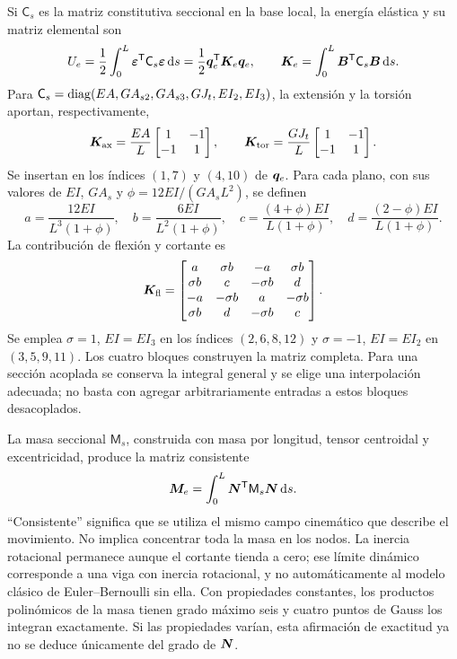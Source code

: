 Si $\mathsf C_s$ es la matriz constitutiva seccional en la base local, la energía
elástica y su matriz elemental son
\begin{equation}
 U_e=\frac12\int_0^L\bm{\varepsilon}^{\mathsf T}\mathsf C_s\bm{\varepsilon}\,\mathrm d s
 =\frac12\bm{q}_e^{\mathsf T}\boldsymbol{K}_e\bm{q}_e,
 \qquad
 \boldsymbol{K}_e=\int_0^L\boldsymbol{B}^{\mathsf T}\mathsf C_s\boldsymbol{B}\,\mathrm d s.
\end{equation}
Para $\mathsf C_s=\operatorname{diag}(EA,GA_{s2},GA_{s3},GJ_t,EI_2,EI_3)$, la extensión y la
torsión aportan, respectivamente,
\begin{equation}
 \boldsymbol{K}_{\rm ax}=\frac{EA}{L}\begin{bmatrix}1&-1\\-1&1\end{bmatrix},
 \qquad
 \boldsymbol{K}_{\rm tor}=\frac{GJ_t}{L}\begin{bmatrix}1&-1\\-1&1\end{bmatrix}.
\end{equation}
Se insertan en los índices $(1,7)$ y $(4,10)$ de $\bm{q}_e$. Para cada plano,
con sus valores de $EI$, $GA_s$ y $\phi=12EI/(GA_sL^2)$, se definen
\begin{equation}
 a=\frac{12EI}{L^3(1+\phi)},\quad b=\frac{6EI}{L^2(1+\phi)},\quad
 c=\frac{(4+\phi)EI}{L(1+\phi)},\quad d=\frac{(2-\phi)EI}{L(1+\phi)}.
\end{equation}
La contribución de flexión y cortante es
\begin{equation}
 \boldsymbol{K}_{\rm fl}=\begin{bmatrix}
 a&\sigma b&-a&\sigma b\\
 \sigma b&c&-\sigma b&d\\
 -a&-\sigma b&a&-\sigma b\\
 \sigma b&d&-\sigma b&c
 \end{bmatrix}.
\end{equation}
Se emplea $\sigma=1$, $EI=EI_3$ en los índices $(2,6,8,12)$ y
$\sigma=-1$, $EI=EI_2$ en $(3,5,9,11)$. Los cuatro bloques construyen la
matriz completa. Para una sección acoplada se conserva la integral general y
se elige una interpolación adecuada; no basta con agregar arbitrariamente
entradas a estos bloques desacoplados.

La masa seccional $\mathsf M_s$, construida con masa por longitud, tensor
centroidal y excentricidad, produce la matriz consistente
\begin{equation}
 \boldsymbol{M}_e=\int_0^L\boldsymbol{N}^{\mathsf T}\mathsf M_s\boldsymbol{N}\,\mathrm d s.
 \label{eq:fe-masa}
\end{equation}
``Consistente'' significa que se utiliza el mismo campo cinemático que
describe el movimiento. No implica concentrar toda la masa en los nodos. La
inercia rotacional permanece aunque el cortante tienda a cero; ese límite
dinámico corresponde a una viga con inercia rotacional, y no automáticamente
al modelo clásico de Euler--Bernoulli sin ella. Con propiedades constantes,
los productos polinómicos de la masa tienen grado máximo seis y cuatro puntos
de Gauss los integran exactamente. Si las propiedades varían, esta afirmación
de exactitud ya no se deduce únicamente del grado de $\boldsymbol{N}$.

